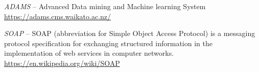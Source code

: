 
\begin{thebibliography}{999}

		\textit{ADAMS} -- Advanced Data mining and Machine learning System \\
		\url{https://adams.cms.waikato.ac.nz/}{}

		\textit{SOAP} -- SOAP (abbreviation for Simple Object Access Protocol)
		is a messaging protocol specification for exchanging structured
		information in the implementation of web services in computer networks. \\
		\url{https://en.wikipedia.org/wiki/SOAP}{}

\end{thebibliography}

